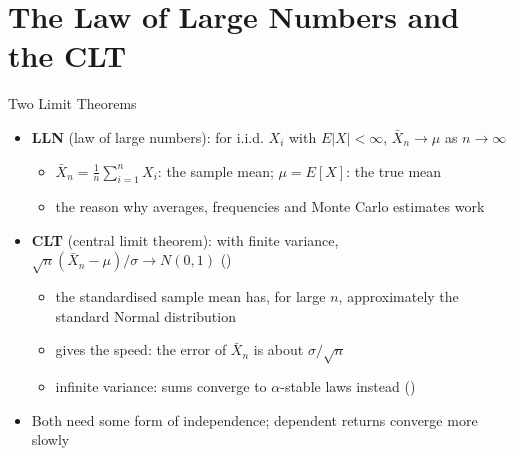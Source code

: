 \section{The Law of Large Numbers and the CLT}

\begin{frame}{Two Limit Theorems}
\itemsize{\small}
\begin{itemize}
    \item \textbf{LLN} (law of large numbers): for i.i.d. $X_i$ with $E|X| < \infty$, $\bar X_n \to \mu$ as $n \to \infty$
    \begin{itemize}
        \item $\bar X_n = \frac1n\sum_{i=1}^n X_i$: the sample mean; $\mu = E[X]$: the true mean
        \item the reason why averages, frequencies and Monte Carlo estimates work
    \end{itemize}
    \item \textbf{CLT} (central limit theorem): with finite variance, $\sqrt{n}(\bar X_n - \mu)/\sigma \to N(0, 1)$ ()
    \begin{itemize}
        \item the standardised sample mean has, for large $n$, approximately the standard Normal distribution
        \item gives the speed: the error of $\bar X_n$ is about $\sigma/\sqrt{n}$
        \item infinite variance: sums converge to $\alpha$-stable laws instead ()
    \end{itemize}
    \item Both need some form of independence; dependent returns converge more slowly
\end{itemize}
\end{frame}

